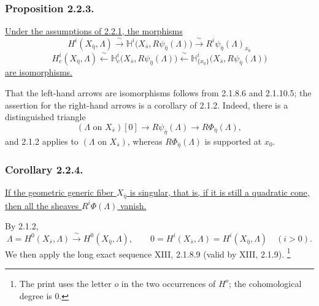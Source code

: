 \subsubsection*{Proposition 2.2.3.}
\underline{Under the assumptions of 2.2.1, the morphisms}
\[
H^i(X_{\bar\eta},\Lambda)
 \xrightarrow{\ \sim\ }
\mathbb H^i\bigl(X_{\bar s},R\psi_{\bar\eta}(\Lambda)\bigr)
 \xrightarrow{\ \sim\ }
R^i\psi_{\bar\eta}(\Lambda)_{x_0}
\]
\[
H_c^i(X_{\bar\eta},\Lambda)
 \xleftarrow{\ \sim\ }
\mathbb H_c^i\bigl(X_{\bar s},R\psi_{\bar\eta}(\Lambda)\bigr)
 \xleftarrow{\ \sim\ }
\mathbb H^i_{\{x_0\}}\bigl(X_{\bar s},R\psi_{\bar\eta}(\Lambda)\bigr)
\]
\underline{are isomorphisms.}

That the left-hand arrows are isomorphisms follows from 2.1.8.6 and
2.1.10.5; the assertion for the right-hand arrows is a corollary of
2.1.2.  Indeed, there is a distinguished triangle
\[
(\Lambda\text{ on }X_{\bar s})[0]
 \longrightarrow R\psi_{\bar\eta}(\Lambda)
 \longrightarrow R\Phi_{\bar\eta}(\Lambda),
\]
and 2.1.2 applies to $(\Lambda\text{ on }X_{\bar s})$, whereas
$R\Phi_{\bar\eta}(\Lambda)$ is supported at $x_0$.

\subsubsection*{Corollary 2.2.4.}
\underline{If the geometric generic fiber $X_{\bar\eta}$ is
singular, that is, if it is still a quadratic cone, then all the
sheaves $R^i\Phi(\Lambda)$ vanish.}

By 2.1.2,
\[
\Lambda=H^0(X_{\bar s},\Lambda)
 \xrightarrow{\ \sim\ }H^0(X_{\bar\eta},\Lambda),
\qquad
0=H^i(X_{\bar s},\Lambda)=H^i(X_{\bar\eta},\Lambda)
\quad(i>0).
\]
We then apply the long exact sequence XIII, 2.1.8.9 (valid by
XIII, 2.1.9).
\footnote{The print uses the letter $o$ in the two occurrences of
$H^o$; the cohomological degree is $0$.}

